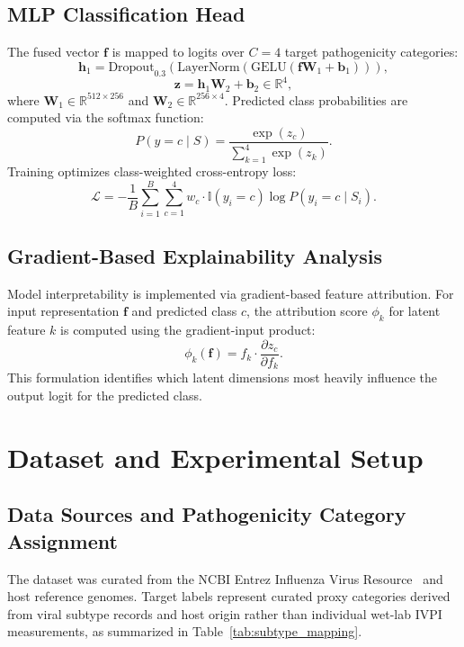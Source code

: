\documentclass[conference]{IEEEtran}
\begin{document}
\subsection{MLP Classification Head}
The fused vector $\mathbf{f}$ is mapped to logits over $C = 4$ target pathogenicity categories:
\begin{equation}
\mathbf{h}_1 = \text{Dropout}_{0.3}(\text{LayerNorm}(\text{GELU}(\mathbf{f} \mathbf{W}_1 + \mathbf{b}_1))),
\label{eq:mlp_h1}
\end{equation}
\begin{equation}
\mathbf{z} = \mathbf{h}_1 \mathbf{W}_2 + \mathbf{b}_2 \in \mathbb{R}^4,
\label{eq:logits}
\end{equation}
where $\mathbf{W}_1 \in \mathbb{R}^{512 \times 256}$ and $\mathbf{W}_2 \in \mathbb{R}^{256 \times 4}$. Predicted class probabilities are computed via the softmax function:
\begin{equation}
P(y = c \mid S) = \frac{\exp(z_c)}{\sum_{k=1}^4 \exp(z_k)}.
\label{eq:softmax}
\end{equation}
Training optimizes class-weighted cross-entropy loss:
\begin{equation}
\mathcal{L} = -\frac{1}{B} \sum_{i=1}^B \sum_{c=1}^4 w_c \cdot \mathbb{I}(y_i = c) \log P(y_i = c \mid S_i).
\label{eq:loss}
\end{equation}

\subsection{Gradient-Based Explainability Analysis}
Model interpretability is implemented via gradient-based feature attribution. For input representation $\mathbf{f}$ and predicted class $c$, the attribution score $\phi_k$ for latent feature $k$ is computed using the gradient-input product:
\begin{equation}
\phi_k(\mathbf{f}) = f_k \cdot \frac{\partial z_c}{\partial f_k}.
\label{eq:shap_grad}
\end{equation}
This formulation identifies which latent dimensions most heavily influence the output logit for the predicted class.

\section{Dataset and Experimental Setup}
\label{sec:dataset_experiments}

\subsection{Data Sources and Pathogenicity Category Assignment}
The dataset was curated from the NCBI Entrez Influenza Virus Resource~\cite{ncbi1988} and host reference genomes. Target labels represent curated proxy categories derived from viral subtype records and host origin rather than individual wet-lab IVPI measurements, as summarized in Table~\ref{tab:subtype_mapping}.
\end{document}
